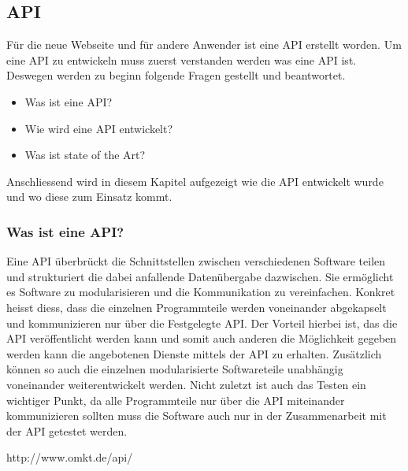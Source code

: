 
\subsection{API}
Für die neue Webseite und für andere Anwender ist eine API erstellt worden. Um eine API zu entwickeln muss zuerst verstanden werden was eine API ist. Deswegen werden zu beginn folgende Fragen gestellt und beantwortet. 
\begin{itemize}
\item Was ist eine API?
\item Wie wird eine API entwickelt?
\item Was ist state of the Art?
\end{itemize}

Anschliessend wird in diesem Kapitel aufgezeigt wie die API entwickelt wurde und wo diese zum Einsatz kommt.

\subsubsection{Was ist eine API?}
Eine API überbrückt die Schnittstellen zwischen verschiedenen Software teilen und strukturiert die dabei anfallende Datenübergabe dazwischen. Sie ermöglicht es Software zu modularisieren und die Kommunikation zu vereinfachen. Konkret heisst diess, dass die einzelnen Programmteile werden voneinander abgekapselt und kommunizieren nur über die Festgelegte API. Der Vorteil hierbei ist, das die API veröffentlicht werden kann und somit auch anderen die Möglichkeit gegeben werden kann die angebotenen Dienste mittels der API zu erhalten. Zusätzlich können so auch die einzelnen modularisierte Softwareteile unabhängig voneinander weiterentwickelt werden. Nicht zuletzt ist auch das Testen ein wichtiger Punkt, da alle Programmteile nur über die API miteinander kommunizieren sollten muss die Software auch nur in der Zusammenarbeit mit der API getestet werden.

http://www.omkt.de/api/


